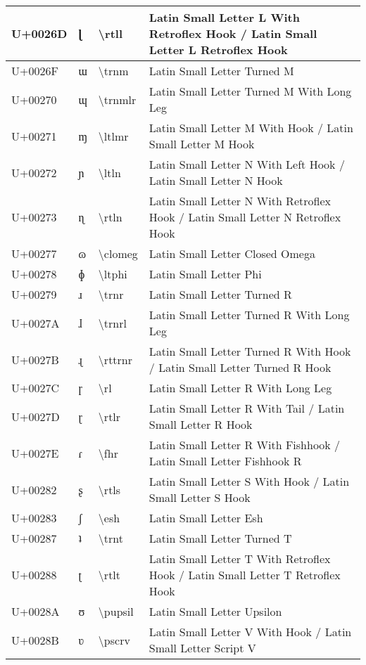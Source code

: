 \begin{table}[h]
\begin{tabulary}{\linewidth}{|L|L|L|L|}
\hline
U+0026D & ɭ & {\textbackslash}rtll & Latin Small Letter L With Retroflex Hook / Latin Small Letter L Retroflex Hook \\
\hline
U+0026F & ɯ & {\textbackslash}trnm & Latin Small Letter Turned M \\
\hline
U+00270 & ɰ & {\textbackslash}trnmlr & Latin Small Letter Turned M With Long Leg \\
\hline
U+00271 & ɱ & {\textbackslash}ltlmr & Latin Small Letter M With Hook / Latin Small Letter M Hook \\
\hline
U+00272 & ɲ & {\textbackslash}ltln & Latin Small Letter N With Left Hook / Latin Small Letter N Hook \\
\hline
U+00273 & ɳ & {\textbackslash}rtln & Latin Small Letter N With Retroflex Hook / Latin Small Letter N Retroflex Hook \\
\hline
U+00277 & ɷ & {\textbackslash}clomeg & Latin Small Letter Closed Omega \\
\hline
U+00278 & ɸ & {\textbackslash}ltphi & Latin Small Letter Phi \\
\hline
U+00279 & ɹ & {\textbackslash}trnr & Latin Small Letter Turned R \\
\hline
U+0027A & ɺ & {\textbackslash}trnrl & Latin Small Letter Turned R With Long Leg \\
\hline
U+0027B & ɻ & {\textbackslash}rttrnr & Latin Small Letter Turned R With Hook / Latin Small Letter Turned R Hook \\
\hline
U+0027C & ɼ & {\textbackslash}rl & Latin Small Letter R With Long Leg \\
\hline
U+0027D & ɽ & {\textbackslash}rtlr & Latin Small Letter R With Tail / Latin Small Letter R Hook \\
\hline
U+0027E & ɾ & {\textbackslash}fhr & Latin Small Letter R With Fishhook / Latin Small Letter Fishhook R \\
\hline
U+00282 & ʂ & {\textbackslash}rtls & Latin Small Letter S With Hook / Latin Small Letter S Hook \\
\hline
U+00283 & ʃ & {\textbackslash}esh & Latin Small Letter Esh \\
\hline
U+00287 & ʇ & {\textbackslash}trnt & Latin Small Letter Turned T \\
\hline
U+00288 & ʈ & {\textbackslash}rtlt & Latin Small Letter T With Retroflex Hook / Latin Small Letter T Retroflex Hook \\
\hline
U+0028A & ʊ & {\textbackslash}pupsil & Latin Small Letter Upsilon \\
\hline
U+0028B & ʋ & {\textbackslash}pscrv & Latin Small Letter V With Hook / Latin Small Letter Script V \\

\end{tabulary}
\end{table}
